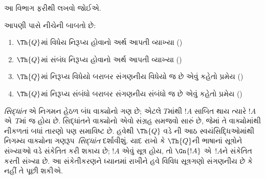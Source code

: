 \documentclass[../../../include/open-logic-section]{subfiles}
\begin{document}


\begin{editorial}
આ વિભાગ ફરીથી લખવો જોઈએ.
\end{editorial}

આપણી પાસે નીચેની બાબતો છે:
\begin{enumerate}
\item $\Th{Q}$માં વિધેય નિરૂપ્ય
  હોવાનો અર્થ આપતી વ્યાખ્યા
  ()
\item $\Th{Q}$માં સંબંધ નિરૂપ્ય
  હોવાનો અર્થ આપતી વ્યાખ્યા
  ()
\item $\Th{Q}$માં નિરૂપ્ય વિધેયો
  બરાબર સંગણનીય વિધેયો જ છે
  એવું કહેતો પ્રમેય
  ()
\item $\Th{Q}$માં નિરૂપ્ય સંબંધો
  બરાબર સંગણનીય સંબંધો જ છે
  એવું કહેતો પ્રમેય
  ()
\end{enumerate}

\emph{સિદ્ધાંત} એ નિગમન હેઠળ
બંધ વાક્યોનો ગણ છે; એટલે
$T$માંથી $!A$ સાબિત થાય
ત્યારે $!A$ એ~$T$માં જ
હોય છે. સિદ્ધાંતને વાક્યોનો
એવો સંગ્રહ સમજવો સારું છે,
જેમાં તે વાક્યોમાંથી નીકળતાં
બધાં તારણો પણ સમાવિષ્ટ છે.
હવેથી $\Th{Q}$ વડે
ની
આઠ સ્વયંસિદ્ધિઓમાંથી નિગમ્ય
વાક્યોના ગણરૂપ~\emph{સિદ્ધાંત}
દર્શાવીશું. યાદ રાખો કે
$\Th{Q}$ની ભાષાનાં સૂત્રોને
સંખ્યાઓ વડે સંકેતિત કરી
શકાય છે; $!A$ એવું સૂત્ર
હોય, તો $\Gn{!A}$ એ~$!A$ને
સંકેતિત કરતી સંખ્યા છે.
આ સંકેતીકરણને ધ્યાનમાં રાખીને
હવે વિવિધ સૂત્રગણો સંગણનીય
છે કે નહીં તે પૂછી શકીએ.
\end{document}
